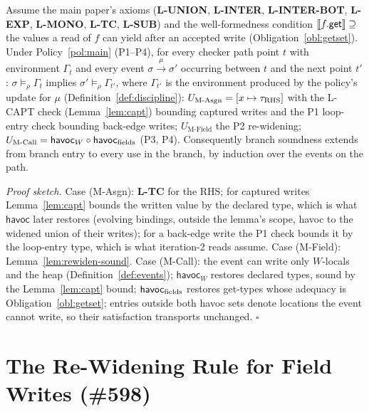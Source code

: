 \documentclass[11pt]{article}
\newcommand{\Env}{\Gamma}
\newcommand{\havoc}{\mathsf{havoc}}
\begin{document}
\begin{lemma}
\label{lem:preservation}
Assume the main paper's axioms (\textbf{L-UNION}, \textbf{L-INTER},
\textbf{L-INTER-BOT}, \textbf{L-EXP}, \textbf{L-MONO}, \textbf{L-TC},
\textbf{L-SUB}) and the
well-formedness condition $\llbracket f.\mathsf{get} \rrbracket \supseteq$ the values a
read of $f$ can yield after an accepted write
(Obligation~\ref{obl:getset}). Under Policy~\ref{pol:main} (P1--P4), for
every checker path point $t$ with environment $\Env_t$ and every event
$\sigma \xrightarrow{\mu} \sigma'$ occurring between $t$ and the next
point $t'$: $\sigma \models_\rho \Env_t$ implies
$\sigma' \models_\rho \Env_{t'}$, where $\Env_{t'}$ is the environment
produced by the policy's update for $\mu$
(Definition~\ref{def:discipline}):
$U_{\text{M-Asgn}} = [x \mapsto \tau_{\rm RHS}]$ with the L-CAPT check
(Lemma~\ref{lem:capt}) bounding captured writes and the P1 loop-entry
check bounding back-edge writes; $U_{\text{M-Field}}$ the P2
re-widening; $U_{\text{M-Call}} = \havoc_W \circ \havoc_{\rm fields}$
(P3, P4). Consequently branch soundness extends from branch entry to
every use in the branch, by induction over the events on the path.
\end{lemma}

\noindent\emph{Proof sketch.} Case (M-Asgn): \textbf{L-TC} for the RHS;
for captured writes Lemma~\ref{lem:capt} bounds the written value by the
declared type, which is what $\havoc$ later restores (evolving bindings,
outside the lemma's scope, havoc to the widened union of their writes);
for a back-edge write the P1 check bounds it by the loop-entry type,
which is what iteration-2 reads assume. Case (M-Field):
Lemma~\ref{lem:rewiden-sound}. Case (M-Call): the event can write only
$W$-locals and the heap (Definition~\ref{def:events}); $\havoc_W$
restores declared types, sound by the Lemma~\ref{lem:capt} bound;
$\havoc_{\rm fields}$ restores get-types whose adequacy is
Obligation~\ref{obl:getset}; entries outside both havoc sets denote
locations the event cannot write, so their satisfaction transports
unchanged. $\square$

\section{The Re-Widening Rule for Field Writes (\#598)}
\label{sec:rewiden}
\end{document}
